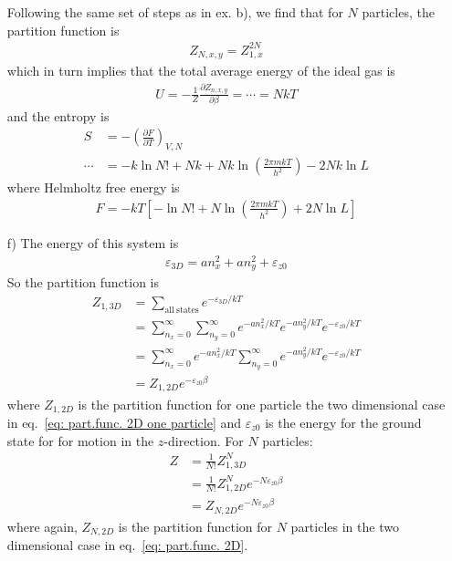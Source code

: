 \documentclass[11pt]{article}
\newcounter{excount}
\newenvironment{exercise}[1][]{\addtocounter{excount}{1} \noindent {\bf Exercise
    \arabic{excount} #1}\hspace{2mm}}{\vspace{4mm}}
\begin{document}
\begin{exercise}
\begin{itemize}
			Following the same set of steps as in ex. b), we find that for $N$ particles, the partition function is
			\begin{align}
				Z_{N,x,y} = Z_{1,x}^{2N} \label{eq: part.func. 2D}
			\end{align}
			which in turn implies that the total average energy of the ideal gas is
			\begin{align}
				U = -\frac{1}{Z}\frac{\partial Z_{n,x,y}}{\partial \beta}  = \cdots = NkT \nonumber
			\end{align}
			and the entropy is
			\begin{align}
				S &= -\left( \frac{\partial F}{\partial T} \right) _{V,N} \nonumber \\
				\cdots &= -k\ln N! + Nk + Nk\ln \left( \frac{2\pi mkT}{h^2} \right) - 2Nk\ln L \nonumber
			\end{align}
			where Helmholtz free energy is
			\begin{align}
				F = -kT \left[-\ln N! + N\ln \left( \frac{2\pi mkT}{h^2} \right) + 2N\ln L \right] \nonumber
			\end{align}
		
		\item[f)]
			 The energy of this system is
			 \begin{align}
			 	\varepsilon_{3D} = an_x^2 + an_y^2 + \varepsilon_{z0} \nonumber
			 \end{align}
			 So the partition function is
			 \begin{align}
			 	Z_{1,3D} 	&= \sum_{\mathrm{all~states}} e^{-\varepsilon_{3D}/kT} \nonumber \\
			 		&= \sum_{n_x=0}^\infty \sum_{n_y=0}^{\infty} e^{-an_x^2/kT}e^{-an_y^2/kT}e^{-\varepsilon_{z0}/kT} \nonumber \\
			 		&= \sum_{n_x=0}^\infty e^{-an_x^2/kT} \sum_{n_y=0}^{\infty} e^{-an_y^2/kT} e^{-\varepsilon_{z0}/kT} \nonumber \\
			 		&= Z_{1,2D} e^{-\varepsilon_{z0}\beta} \nonumber
			 \end{align}
			 where $Z_{1,2D}$ is the partition function for one particle the two dimensional case in eq.~\ref{eq: part.func. 2D one particle} and $\varepsilon_{z0}$ is the energy for the ground state for for motion in the $z$-direction.
			 For $N$ particles:
			 \begin{align}
			 	Z 	&= \frac{1}{N!}Z_{1,3D}^N \nonumber \\
			 		&= \frac{1}{N!}Z_{1,2D}^N e^{-N\varepsilon_{z0}\beta} \nonumber \\
			 		&= Z_{N,2D} e^{-N\varepsilon_{z0}\beta} \nonumber
			 \end{align}
			 where again, $Z_{N,2D}$ is the partition function for $N$ particles in the two dimensional case in eq.~\ref{eq: part.func. 2D}. 
			

\end{itemize}
\end{exercise}
\end{document}
